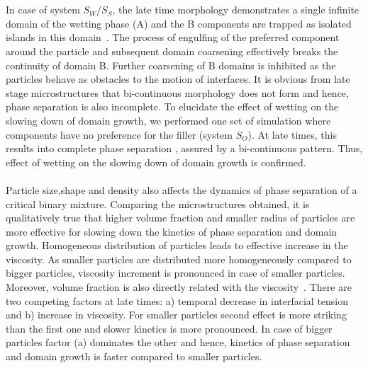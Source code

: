 \documentclass[12pt]{iiscthes}
\theoremstyle{definition}
\theoremstyle{definition}
\theoremstyle{remark}
\begin{document}
\\ \\
In case of system $S_W/S_S$, the late time morphology demonstrates a single infinite domain of the wetting phase (A) and the B components are trapped as isolated islands in this domain~\cite{Lee}. The process of engulfing of the preferred component around the particle and subsequent domain coarsening effectively breaks the continuity of domain B. Further coarsening of B domains is inhibited as the particles behave as obstacles to the motion of interfaces. It is obvious from late stage microstructures that bi-continuous morphology does not form and hence, phase separation is also incomplete. To elucidate the effect of wetting on the slowing down of domain growth, we performed one set of simulation where components have no preference for the filler (system $S_O$). At late times, this results into complete phase separation , assured by a bi-continuous pattern. Thus, effect of wetting on the slowing down of domain growth is confirmed.
\\ \\
Particle size,shape and density also affects the dynamics of phase separation of a critical binary mixture. Comparing the microstructures obtained, it is qualitatively true that higher volume fraction and smaller radius of particles are more effective for slowing down the kinetics of phase separation and domain growth. Homogeneous distribution of particles leads to effective increase in the viscosity. As smaller particles are distributed more homogeneously compared to bigger particles, viscosity increment is pronounced in case of smaller particles. Moreover, volume fraction is also directly related with the viscosity~\cite{Hore}. There are two competing factors at late times: a) temporal decrease in interfacial tension and b) increase in viscosity. For smaller particles second effect is more striking than the first one and slower kinetics is more pronounced. In case of bigger particles factor (a) dominates the other and hence, kinetics of phase separation and domain growth is faster compared to smaller particles.       
\newpage
\enlargethispage{1in}
\end{document}
